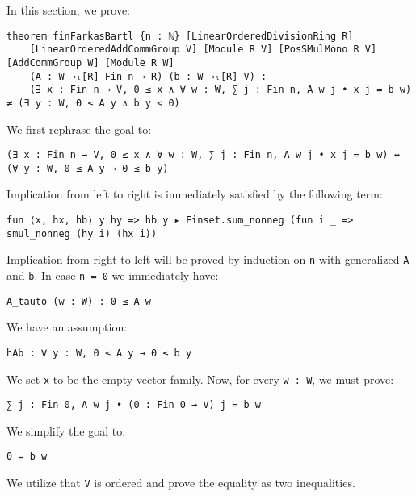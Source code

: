 \documentclass[]{article}
\renewcommand{\.}{\hskip .75pt}
\begin{document}
	


\noindent In this section, we prove:
\begin{lstlisting}
theorem finFarkasBartl {n : ℕ} [LinearOrderedDivisionRing R]
    [LinearOrderedAddCommGroup V] [Module R V] [PosSMulMono R V] [AddCommGroup W] [Module R W]
    (A : W →ₗ[R] Fin n → R) (b : W →ₗ[R] V) :
    (∃ x : Fin n → V, 0 ≤ x ∧ ∀ w : W, ∑ j : Fin n, A w j • x j = b w) ≠ (∃ y : W, 0 ≤ A y ∧ b y < 0)
\end{lstlisting}
We first rephrase the goal to:
\begin{lstlisting}
(∃ x : Fin n → V, 0 ≤ x ∧ ∀ w : W, ∑ j : Fin n, A w j • x j = b w) ↔ (∀ y : W, 0 ≤ A y → 0 ≤ b y)
\end{lstlisting}
Implication from left to right is immediately satisfied by the following term:
\begin{lstlisting}
fun ⟨x, hx, hb⟩ y hy => hb y ▸ Finset.sum_nonneg (fun i _ => smul_nonneg (hy i) (hx i))
\end{lstlisting}
Implication from right to left will be proved by induction on \texttt{n} with generalized \texttt{A} and \texttt{b}.
In case \texttt{n = 0} we immediately have:
\begin{lstlisting}
A_tauto (w : W) : 0 ≤ A w
\end{lstlisting}
We have an assumption:
\begin{lstlisting}
hAb : ∀ y : W, 0 ≤ A y → 0 ≤ b y
\end{lstlisting}
We set \texttt{x} to be the empty vector family. Now, for every \texttt{w :~W}, we must prove:
\begin{lstlisting}
∑ j : Fin 0, A w j • (0 : Fin 0 → V) j = b w
\end{lstlisting}
We simplify the goal to:
\begin{lstlisting}
0 = b w
\end{lstlisting}
We utilize that \texttt{V} is ordered and prove the equality as two inequalities.
\end{document}
